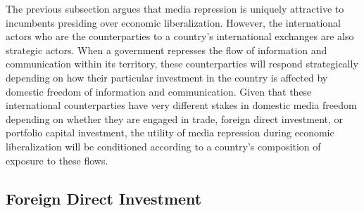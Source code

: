 \documentclass[a4paper]{article}\usepackage[]{graphicx}\usepackage[]{color}
\begin{document}
The previous subsection argues that media repression is uniquely attractive to incumbents presiding over economic liberalization. However, the international actors who are the counterparties to a country's international exchanges are also strategic actors. When a government represses the flow of information and communication within its territory, these counterparties will respond strategically depending on how their particular investment in the country is affected by domestic freedom of information and communication. Given that these international counterparties have very different stakes in domestic media freedom depending on whether they are engaged in trade, foreign direct investment, or portfolio capital investment, the utility of media repression during economic liberalization will be conditioned according to a country's composition of exposure to these flows.

\subsection{Foreign Direct Investment}
\end{document}
